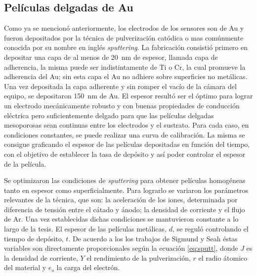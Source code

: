 { 		\subsection{Películas delgadas de Au}

		 Como ya se mencionó anteriormente, los electrodos de los sensores son de Au y fueron depositados por la técnica de pulverización catódica o mas comúnmente conocida por su nombre en inglés \textit{sputtering}. La fabricación consistió primero en depositar una capa de al menos de \SI{20}{\nm} de espesor, llamada capa de  adherencia, la misma puede ser indistintamente de Ti o Cr, la cual promueve la adherencia del Au; sin esta capa el Au no adhiere sobre superficies no metálicas.\cite{Hieber1976} Una vez depositada la capa adherente y sin romper el vacío de la cámara del equipo, se depositaron \SI{150}{nm} de Au. El espesor resultó ser el óptimo para lograr un electrodo mecánicamente robusto y con buenas propiedades de conducción eléctrica pero suficientemente delgado para que las películas delgadas mesoporosas sean continuas entre los electrodos y el sustrato. Para cada caso, en condiciones constantes, se puede realizar una curva de calibración. La misma se consigue graficando el espesor de las películas depositadas en función del tiempo, con el objetivo de establecer la tasa de depósito y así poder controlar el espesor de la película. 

		 Se optimizaron las condiciones de \textit{sputtering} para obtener películas homogéneas tanto en espesor como superficialmente. Para lograrlo se variaron los parámetros relevantes de la técnica, que son: la aceleración de los iones, determinada por diferencia de tensión entre el cátado y ánodo; la densidad de corriente y el flujo de Ar. Una vez establecidas dichas condiciones se mantuvieron constante a lo largo de la tesis. El espesor de las películas metálicas, $d$, se reguló controlando el tiempo de depósito, $t$. De acuerdo a los los trabajos de Sigmund\cite{sigmund1968} y Seah\cite{Seah2005} éstas variables son directamente proporcionales según la ecuación \ref{eq:sputt}, donde $J$ es la densidad de corriente, $Y$ el rendimiento de la pulverización, $r$ el radio átomico del material y $e_o$ la carga del electrón.

}
